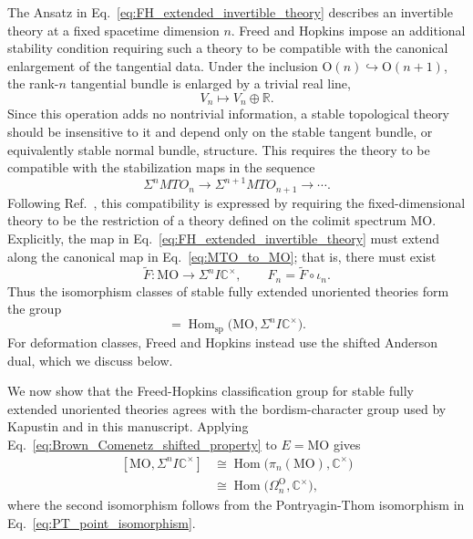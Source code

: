 \documentclass[aps,prx,reprint,superscriptaddress,twocolumn,amsmath,amssymb,amsfonts, nofootinbib]{revtex4-2}
\theoremstyle{apsstyle}
\begin{document}
\bigskip 

The Ansatz in Eq.~\eqref{eq:FH_extended_invertible_theory} describes an invertible theory at a fixed spacetime dimension $n$. Freed and Hopkins impose an additional stability condition requiring such a
theory to be compatible with the canonical enlargement of the tangential data. Under the inclusion $\mathrm O(n)\hookrightarrow\mathrm O(n+1)$, the rank-$n$ tangential bundle is enlarged by a trivial real line,
\begin{equation*}
    V_n\longmapsto V_n\oplus\mathbb R.
\end{equation*}
Since this operation adds no nontrivial information, a stable topological theory should be insensitive to it and depend only on the stable tangent bundle, or equivalently stable normal bundle, structure. This requires the theory to be compatible with the stabilization maps in the sequence
\begin{equation*}
    \Sigma^nMTO_n
    \longrightarrow
    \Sigma^{n+1}MTO_{n+1}
    \longrightarrow\cdots .
\end{equation*}
Following Ref.~\cite[Def.~7.16]{FreedHopkins}, this compatibility is expressed by requiring the fixed-dimensional theory to be the restriction of a theory defined on the colimit spectrum $\mathrm{MO}$. Explicitly, the map in Eq.~\eqref{eq:FH_extended_invertible_theory} must extend along the canonical map in Eq.~\eqref{eq:MTO_to_MO}; that is, there must exist
\begin{equation}
    \widetilde F:
    \mathrm{MO}
    \longrightarrow
    \Sigma^nI\mathbb C^\times,
    \qquad
    F_n=\widetilde F\circ\iota_n.
    \label{eq:stable_theory_extension}
\end{equation}
Thus the isomorphism classes of stable fully extended unoriented
theories form the group
\begin{equation}
    [MO, \Sigma^nI\mathbb C^\times]=\operatorname{Hom}_{\mathrm{sp}}
    \bigl(
        \mathrm{MO},
        \Sigma^nI\mathbb C^\times
    \bigr).
    \label{eq:FH_stable_unoriented_classification}
\end{equation}
For deformation classes, Freed and Hopkins instead use the shifted
Anderson dual, which we discuss below.


\bigskip 

We now show that the Freed-Hopkins classification group for stable fully extended unoriented theories agrees with the bordism-character group used by Kapustin and in this manuscript. Applying Eq.~\ref{eq:Brown_Comenetz_shifted_property} to $E=\mathrm{MO}$ gives
\begin{equation}
\begin{aligned}
    \left[
        \mathrm{MO},
        \Sigma^nI\mathbb C^\times
    \right]
    &\cong
    \operatorname{Hom}
    \bigl(\pi_n(\mathrm{MO}),\mathbb C^\times\bigr)\\
    &\cong
    \operatorname{Hom}
    \bigl(\Omega_n^{\mathrm O},\mathbb C^\times\bigr),
\end{aligned}
\label{eq:FH_to_bordism_characters}
\end{equation}
where the second isomorphism follows from the Pontryagin-Thom
isomorphism in Eq.~\eqref{eq:PT_point_isomorphism}.
\end{document}
